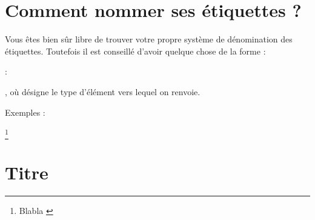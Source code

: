 \section{Comment nommer ses étiquettes ?}

Vous êtes bien sûr libre de trouver votre propre système de dénomination des étiquettes. Toutefois il est conseillé d'avoir quelque chose de la forme : \begin{english}:\end{english}, où  désigne le type d'élément vers lequel on renvoie.

Exemples :

\begin{english}
\begin{latexcode}
\footnote{Blabla \label{note:nom}}
\section{Titre \label{section:nom}}
\end{latexcode}
\end{english}


